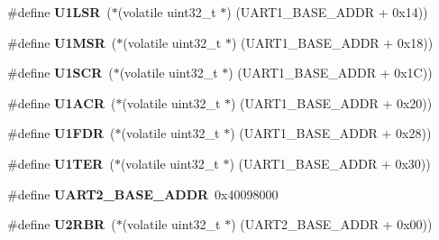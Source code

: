 \begin{DoxyCompactItemize}
\item 
\mbox{\label{group__lpc24xx__regs_ga2e8279488652c2ee02996bce1707a317}} 
\#define {\bfseries U1\+L\+SR}~($\ast$(volatile uint32\+\_\+t $\ast$) (U\+A\+R\+T1\+\_\+\+B\+A\+S\+E\+\_\+\+A\+D\+DR + 0x14))
\item 
\mbox{\label{group__lpc24xx__regs_ga06b03163db31d7c0b561376d1ff2e0c1}} 
\#define {\bfseries U1\+M\+SR}~($\ast$(volatile uint32\+\_\+t $\ast$) (U\+A\+R\+T1\+\_\+\+B\+A\+S\+E\+\_\+\+A\+D\+DR + 0x18))
\item 
\mbox{\label{group__lpc24xx__regs_gaab43408d276c938324f4bf6ebefc83d2}} 
\#define {\bfseries U1\+S\+CR}~($\ast$(volatile uint32\+\_\+t $\ast$) (U\+A\+R\+T1\+\_\+\+B\+A\+S\+E\+\_\+\+A\+D\+DR + 0x1\+C))
\item 
\mbox{\label{group__lpc24xx__regs_ga35dc834b87112f37f445e9b9c1a75e10}} 
\#define {\bfseries U1\+A\+CR}~($\ast$(volatile uint32\+\_\+t $\ast$) (U\+A\+R\+T1\+\_\+\+B\+A\+S\+E\+\_\+\+A\+D\+DR + 0x20))
\item 
\mbox{\label{group__lpc24xx__regs_gaab141ab2a704bd49956d424b5ca25e33}} 
\#define {\bfseries U1\+F\+DR}~($\ast$(volatile uint32\+\_\+t $\ast$) (U\+A\+R\+T1\+\_\+\+B\+A\+S\+E\+\_\+\+A\+D\+DR + 0x28))
\item 
\mbox{\label{group__lpc24xx__regs_ga71598b464e2c60582b2511097528b417}} 
\#define {\bfseries U1\+T\+ER}~($\ast$(volatile uint32\+\_\+t $\ast$) (U\+A\+R\+T1\+\_\+\+B\+A\+S\+E\+\_\+\+A\+D\+DR + 0x30))
\item 
\mbox{\label{group__lpc24xx__regs_gab98cfeb5bce374d602f85bc3535b81f1}} 
\#define {\bfseries U\+A\+R\+T2\+\_\+\+B\+A\+S\+E\+\_\+\+A\+D\+DR}~0x40098000
\item 
\mbox{\label{group__lpc24xx__regs_ga3217ab15a4742277c2c5d02041b18f9e}} 
\#define {\bfseries U2\+R\+BR}~($\ast$(volatile uint32\+\_\+t $\ast$) (U\+A\+R\+T2\+\_\+\+B\+A\+S\+E\+\_\+\+A\+D\+DR + 0x00))
\item 
\mbox{\label{group__lpc24xx__regs_ga70fdd49f450383eab8c9470d5c573ba7}} 

\end{DoxyCompactItemize}
